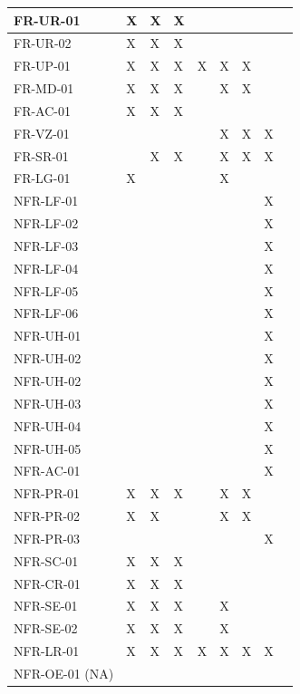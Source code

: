 \documentclass[12pt, titlepage]{article}
\begin{document}
\begin{longtable}{|p{3.5cm}|p{1cm}|p{1cm}|p{1cm}|p{1cm}|p{1cm}|p{1cm}|p{1cm}|p{1cm}}
    FR-UR-01  & X & X & X & & & &\\\hline
    FR-UR-02 & X & X & X & & & & \\\hline
    FR-UP-01 & X & X & X & X & X & X & \\\hline
    FR-MD-01 & X & X & X &  & X & X &  \\\hline
    FR-AC-01  & X & X & X &  &  &  &  \\\hline
    FR-VZ-01  &  &  &  &  & X & X & X \\\hline
    FR-SR-01  &  & X & X &  & X & X & X \\\hline
    FR-LG-01  & X &  &  &  & X &  &  \\\hline
    NFR-LF-01  &  &  &  &  &  &  & X \\\hline
    NFR-LF-02  &  &  &  &  &  &  & X \\\hline
    NFR-LF-03  &  &  &  &  &  &  & X \\\hline
    NFR-LF-04  &  &  &  &  &  &  & X \\\hline
    NFR-LF-05  &  &  &  &  &  &  & X \\\hline
    NFR-LF-06  &  &  &  &  &  &  & X \\\hline
    NFR-UH-01  &  &  &  &  &  &  & X \\\hline
    NFR-UH-02  &  &  &  &  &  &  & X \\\hline
    NFR-UH-02  &  &  &  &  &  &  & X \\\hline
    NFR-UH-03  &  &  &  &  &  &  & X \\\hline
    NFR-UH-04  &  &  &  &  &  &  & X \\\hline
    NFR-UH-05  &  &  &  &  &  &  & X \\\hline
    NFR-AC-01  &  &  &  &  &  &  & X \\\hline
    NFR-PR-01  & X & X & X &  & X & X &  \\\hline
    NFR-PR-02  & X & X &  &  & X & X &  \\\hline
    NFR-PR-03  &  &  &  &  &  &  & X \\\hline
    NFR-SC-01  & X & X & X &  &  &  &  \\\hline
    NFR-CR-01  & X & X & X &  &  &  &  \\\hline
    NFR-SE-01  & X & X & X &  & X &  &  \\\hline
    NFR-SE-02  & X & X & X &  & X &  &  \\\hline
    NFR-LR-01  & X & X & X & X & X & X & X \\\hline
    NFR-OE-01 (NA) &  &  &  &  &  &  &  \\\hline

\end{longtable}
\end{document}
